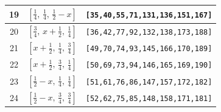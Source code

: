 \documentclass[fleqn,8pt]{jsarticle}
\begin{document}
\begin{longtable}{ccc}
19 & $\left[ \frac{1}{4},\, \frac{1}{4},\, \frac{1}{2} - x \right]$ & {\tt [35,40,55,71,131,136,151,167]} \\ \hline
20 & $\left[ \frac{3}{4},\, x + \frac{1}{2},\, \frac{1}{4} \right]$ & {\tt [36,42,77,92,132,138,173,188]} \\ \hline
21 & $\left[ x + \frac{1}{2},\, \frac{1}{4},\, \frac{3}{4} \right]$ & {\tt [49,70,74,93,145,166,170,189]} \\ \hline
22 & $\left[ x + \frac{1}{2},\, \frac{3}{4},\, \frac{1}{4} \right]$ & {\tt [50,69,73,94,146,165,169,190]} \\ \hline
23 & $\left[ \frac{1}{2} - x,\, \frac{1}{4},\, \frac{1}{4} \right]$ & {\tt [51,61,76,86,147,157,172,182]} \\ \hline
24 & $\left[ \frac{1}{2} - x,\, \frac{3}{4},\, \frac{3}{4} \right]$ & {\tt [52,62,75,85,148,158,171,181]} \\
\end{longtable}
\renewcommand{\arraystretch}{1.2}
\end{document}
